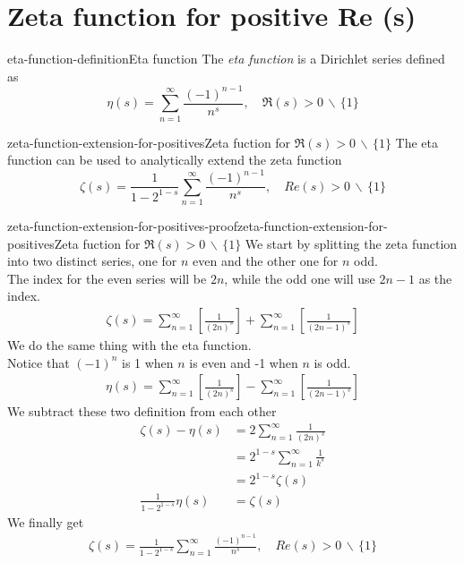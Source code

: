 \documentclass[preview]{standalone}
\newcommand{\exceptone}{
    \,\backslash\,\{1\}
}
\begin{document}
\genpage

\section{Zeta function for positive Re (s)}

\begin{snippetdefinition}{eta-function-definition}{Eta function}
    The \textit{eta function} is a Dirichlet series defined as
    \[
        \eta(s)=\sum_{n=1}^{\infty}\frac{{(-1)}^{n-1}}{n^s},
        \quad \Re(s)>0\exceptone
    \]
\end{snippetdefinition}

\begin{snippettheorem}{zeta-function-extension-for-positives}{Zeta fuction for \(\Re(s) > 0 \exceptone\)}
    The eta function can be used to analytically extend the zeta function
    \[
        \zeta(s)=\frac{1}{1-2^{1-s}}\sum_{n=1}^{\infty}\frac{{(-1)}^{n-1}}{n^s},
        \quad Re(s)>0\exceptone
    \]
\end{snippettheorem}

\begin{snippetproof}{zeta-function-extension-for-positives-proof}{zeta-function-extension-for-positives}{Zeta fuction for \(\Re(s) > 0 \exceptone\)}
    We start by splitting the zeta function into two distinct series, one for \(n\) even and the other one for \(n\) odd.
    \\
    The index for the even series will be \(2n\), while the odd one will use \(2n-1\) as the index.
    \begin{align*}
        \zeta(s)=
        \sum_{n=1}^{\infty}\left[\frac{1}{{(2n)}^s}\right]+
        \sum_{n=1}^{\infty}\left[\frac{1}{{(2n-1)}^s}\right]
    \end{align*}
    We do the same thing with the eta function.
    \\
    Notice that \({(-1)}^n\) is 1 when \(n\) is even and -1 when \(n\) is odd.
    \begin{align*}
        \eta(s)=
        \sum_{n=1}^{\infty}\left[\frac{1}{{(2n)}^s}\right]-
        \sum_{n=1}^{\infty}\left[\frac{1}{{(2n-1)}^s}\right]
    \end{align*}
    We subtract these two definition from each other
    \begin{align*}
        \zeta(s)-\eta(s)&=
        2\sum_{n=1}^{\infty}\frac{1}{{(2n)}^s}
        \\
        &=2^{1-s}\sum_{n=1}^{\infty}\frac{1}{k^s}
        \\
        &=2^{1-s}\zeta(s)
        \\
        \frac{1}{1-2^{1-s}}\eta(s)&=\zeta(s)
    \end{align*}
    We finally get
    \begin{align*}
        \zeta(s)=\frac{1}{1-2^{1-s}}\sum_{n=1}^{\infty}\frac{{(-1)}^{n-1}}{n^s},
        \quad Re(s)>0\exceptone
    \end{align*}
\end{snippetproof}
\end{document}
